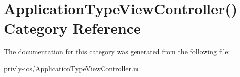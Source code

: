 \hypertarget{category_application_type_view_controller_07_08}{\section{Application\-Type\-View\-Controller() Category Reference}
\label{category_application_type_view_controller_07_08}
}


The documentation for this category was generated from the following file\-:\begin{DoxyCompactItemize}
\item 
privly-\/ios/Application\-Type\-View\-Controller.\-m\end{DoxyCompactItemize}
